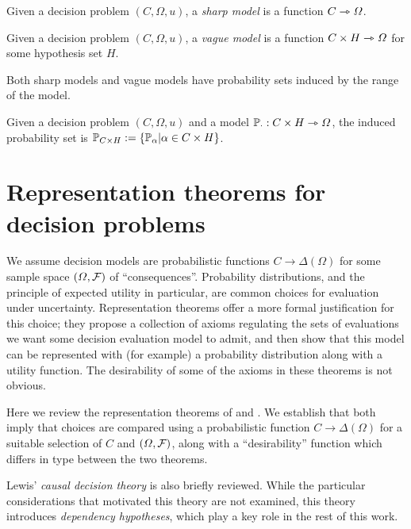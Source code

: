 \begin{definition}
Given a decision problem $(C,\Omega,u)$, a \emph{sharp model} is a function $C\rightarrowtriangle \Omega$.
\end{definition}

\begin{definition}
Given a decision problem $(C,\Omega,u)$, a \emph{vague model} is a function $C\times H\rightarrowtriangle \Omega$ for some hypothesis set $H$.
\end{definition}

Both sharp models and vague models have probability sets induced by the range of the model.

\begin{definition}\label{def:induced_pset_1}
Given a decision problem $(C,\Omega,u)$ and a model $\mathbb{P}_\cdot:C\times H\rightarrowtriangle \Omega$, the induced probability set is $\mathbb{P}_{C\times H}:=\{\mathbb{P}_\alpha|\alpha\in C\times H\}$.
\end{definition}


\section{Representation theorems for decision problems }\label{sec:how_represent_conseqeunces}

We assume decision models are probabilistic functions $C\to \Delta(\Omega)$ for some sample space $(\Omega,\mathcal{F})$ of ``consequences''. Probability distributions, and the principle of expected utility in particular, are common choices for evaluation under uncertainty. Representation theorems offer a more formal justification for this choice; they propose a collection of axioms regulating the sets of evaluations we want some decision evaluation model to admit, and then show that this model can be represented with (for example) a probability distribution along with a utility function. The desirability of some of the axioms in these theorems is not obvious. 

Here we review the representation theorems of \citet{savage_foundations_1954} and \citet{jeffrey_logic_1990}. We establish that both imply that choices are compared using a probabilistic function $C\to \Delta(\Omega)$ for a suitable selection of $C$ and $(\Omega,\mathcal{F})$, along with a ``desirability'' function which differs in type between the two theorems.

Lewis' \emph{causal decision theory} is also briefly reviewed. While the particular considerations that motivated this theory are not examined, this theory introduces \emph{dependency hypotheses}, which play a key role in the rest of this work.

